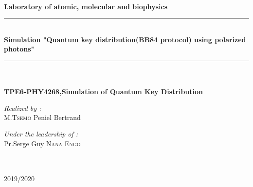\documentclass[a4paper,12pt]{article}
\begin{document}
\begin{titlepage}
\begin{center}
\begin{minipage}{6cm}
		\end{minipage}
		\textsc{\Large }\\[1.5cm]
		{\large \bfseries Laboratory of atomic, molecular and biophysics}\\[0.3cm]
			\rule{\linewidth}{0.3mm} \\[0.4cm]
			{ \huge \bfseries\color{blue!70!black}Simulation "Quantum key distribution(BB84 protocol) using polarized photons" \\[0.4cm] }
			\rule{\linewidth}{0.3mm} \\[1cm]
			\noindent
			\textsc{\Large }\\[-0.5cm]
			{\large \bfseries TPE6-PHY4268,Simulation of Quantum Key Distribution}\\[1.0cm]
			\begin{minipage}{0.4\textwidth}
				\begin{flushleft} \large
					\emph{\color{orange!80!black}Realized by :}\\
					\textsc{M.Tsemo} Peniel Bertrand
				\end{flushleft}
			\end{minipage}%
			\begin{minipage}{0.5\textwidth}
				\begin{flushright} \large
					\emph{\color{orange!80!black}Under the leadership of :} \\
					Pr.Serge Guy \textsc{Nana Engo} 
				\end{flushright}
			\end{minipage}\\[1cm]
			{\large \color{orange!80!black}{Année académique}\\ \color{blue!80!black}2019/2020}
				\end{center}
	\end{titlepage}
\end{document}
